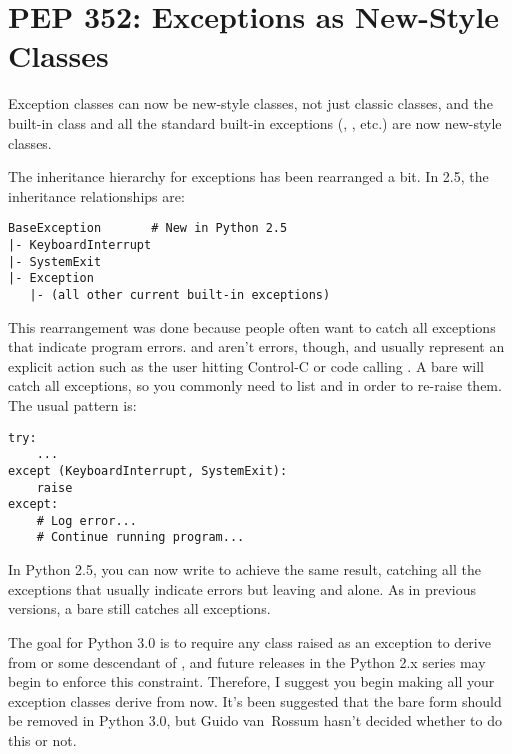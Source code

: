 \documentclass{howto}
\begin{document}
\section{PEP 352: Exceptions as New-Style Classes\label{pep-352}}

Exception classes can now be new-style classes, not just classic
classes, and the built-in  class and all the
standard built-in exceptions (,
, etc.) are now new-style classes.

The inheritance hierarchy for exceptions has been rearranged a bit.
In 2.5, the inheritance relationships are:

\begin{verbatim}
BaseException       # New in Python 2.5
|- KeyboardInterrupt
|- SystemExit
|- Exception
   |- (all other current built-in exceptions)
\end{verbatim}

This rearrangement was done because people often want to catch all
exceptions that indicate program errors.   and
 aren't errors, though, and usually represent an explicit
action such as the user hitting Control-C or code calling
.  A bare  will catch all exceptions,
so you commonly need to list  and
 in order to re-raise them.  The usual pattern is:

\begin{verbatim}
try:
    ...
except (KeyboardInterrupt, SystemExit):
    raise
except: 
    # Log error...  
    # Continue running program...
\end{verbatim}

In Python 2.5, you can now write  to achieve
the same result, catching all the exceptions that usually indicate errors 
but leaving  and
 alone.  As in previous versions,
a bare  still catches all exceptions.

The goal for Python 3.0 is to require any class raised as an exception
to derive from  or some descendant of
, and future releases in the
Python 2.x series may begin to enforce this constraint.  Therefore, I
suggest you begin making all your exception classes derive from
 now.  It's been suggested that the bare
 form should be removed in Python 3.0, but Guido van~Rossum
hasn't decided whether to do this or not.
\end{document}
